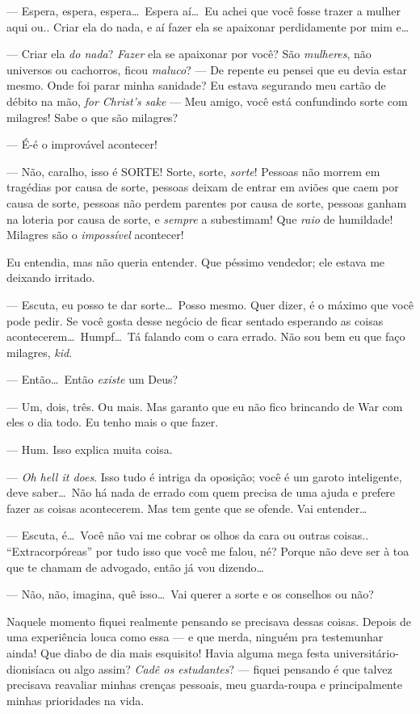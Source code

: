 --- Espera, espera, espera\ldots \ Espera aí\ldots \ Eu achei que você fosse trazer a mulher aqui ou.. Criar ela do nada, e aí fazer ela se apaixonar perdidamente por mim e\ldots

--- Criar ela \emph{do nada}? \emph{Fazer} ela se apaixonar por você? São \emph{mulheres}, não universos ou cachorros, ficou \emph{maluco}?  --- De repente eu pensei que eu devia estar mesmo. Onde foi parar minha sanidade? Eu estava segurando meu cartão de débito na mão, \emph{for Christ’s sake} --- Meu amigo, você está confundindo sorte com milagres! Sabe o que são milagres?

--- É-é o improvável acontecer!

--- Não, caralho, isso é SORTE! Sorte, sorte, \emph{sorte}! Pessoas não morrem em tragédias por causa de sorte, pessoas deixam de entrar em aviões que caem por causa de sorte, pessoas não perdem parentes por causa de sorte, pessoas ganham na loteria por causa de sorte, e \emph{sempre} a subestimam! Que \emph{raio} de humildade! Milagres são o \emph{impossível} acontecer!

Eu entendia, mas não queria entender. Que péssimo vendedor; ele estava me deixando irritado.

--- Escuta, eu posso te dar sorte\ldots \ Posso mesmo. Quer dizer, é o máximo que você pode pedir. Se você gosta desse negócio de ficar sentado esperando as coisas acontecerem\ldots \ Humpf\ldots \ Tá falando com o cara errado. Não sou bem eu que faço milagres, \emph{kid}.

--- Então\ldots \ Então \emph{existe} um Deus?

--- Um, dois, três. Ou mais. Mas garanto que eu não fico brincando de War com eles o dia todo. Eu tenho mais o que fazer.

--- Hum. Isso explica muita coisa.

--- \emph{Oh hell it does}. Isso tudo é intriga da oposição; você é um garoto inteligente, deve saber\ldots \ Não há nada de errado com quem precisa de uma ajuda e prefere fazer as coisas acontecerem. Mas tem gente que se ofende. Vai entender\ldots

--- Escuta, é\ldots \ Você não vai me cobrar os olhos da cara ou outras coisas.. ``Extracorpóreas'' por tudo isso que você me falou, né? Porque não deve ser à toa que te chamam de advogado, então já vou dizendo\ldots

--- Não, não, imagina, quê isso\ldots \ Vai querer a sorte e os conselhos ou não?

Naquele momento fiquei realmente pensando se precisava dessas coisas. Depois de uma experiência louca como essa --- e que merda, ninguém pra testemunhar ainda! Que diabo de dia mais esquisito! Havia alguma mega festa u\-ni\-ver\-si\-tá\-ri\-o-dio\-ni\-sí\-a\-ca ou algo assim? \emph{Cadê os estudantes}? --- fiquei pensando é que talvez precisava reavaliar minhas crenças pessoais, meu guarda-roupa e principalmente minhas prioridades na vida.

